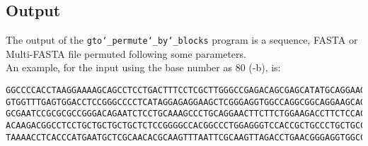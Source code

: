 \subsection*{Output}
The output of the \texttt{gto\char`_permute\char`_by\char`_blocks} program is a sequence, FASTA or Multi-FASTA file permuted following some parameters.\\
An example, for the input using the base number as 80 (-b), is:
\begin{lstlisting}
GGCCCCACCTAAGGAAAAGCAGCCTCCTGACTTTCCTCGCTTGGGCCGAGACAGCGAGCATATGCAGGAAGCGGCAGGAA
GTGGTTTGAGTGGACCTCCGGGCCCCTCATAGGAGAGGAAGCTCGGGAGGTGGCCAGGCGGCAGGAAGCAGGCCAGTGCC
GCGAATCCGCGCGCCGGGACAGAATCTCCTGCAAAGCCCTGCAGGAACTTCTTCTGGAAGACCTTCTCCACCCCCCCAGC
ACAAGACGGCCTCCTGCTGCTGCTGCTCTCCGGGGCCACGGCCCTGGAGGGTCCACCGCTGCCCTGCTGCCATTGTCCCC
TAAAACCTCACCCATGAATGCTCGCAACACGCAAGTTTAATTCGCAAGTTAGACCTGAACGGGAGGTGGCCACGCAAGTT
\end{lstlisting}